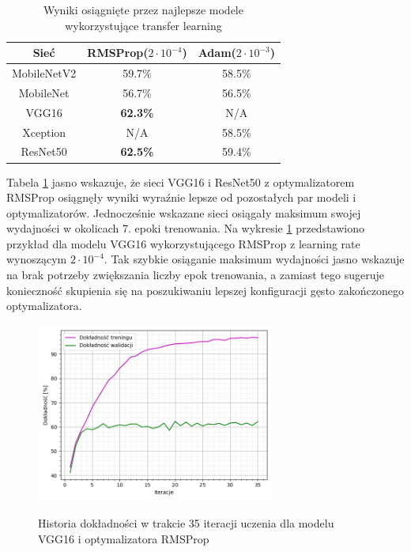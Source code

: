 \begin{table}[H]
  \centering
  \caption{Wyniki osiągnięte przez najlepsze modele wykorzystujące transfer learning}
    \begin{tabular}{ |c|c|c| }
    \hline
    Sieć & RMSProp($2\cdot10^{-4}$) & Adam($2\cdot10^{-3}$) \\
    \hline
    MobileNetV2 & 59.7\% & 58.5\% \\ 
    MobileNet & 56.7\% & 56.5\% \\ 
    VGG16 & \textbf{62.3\%} & N/A \\
    Xception & N/A & 58.5\% \\ 
    ResNet50 & \textbf{62.5\%} & 59.4\% \\ 
    \hline
    \end{tabular}
  \label{tab:5.13}
\end{table}

Tabela \ref{tab:5.13} jasno wskazuje, że sieci VGG16 i ResNet50 z optymalizatorem RMSProp osiągnęły wyniki wyraźnie lepsze od pozostałych par modeli i optymalizatorów. Jednocześnie wskazane sieci osiągały maksimum swojej wydajności w okolicach 7. epoki trenowania. Na wykresie \ref{pic:5.6} przedstawiono przykład dla modelu VGG16 wykorzystującego RMSProp z learning rate wynoszącym $2\cdot10^{-4}$. Tak szybkie osiąganie maksimum wydajności jasno wskazuje na brak potrzeby zwiększania liczby epok trenowania, a zamiast tego sugeruje konieczność skupienia się na poszukiwaniu lepszej konfiguracji gęsto zakończonego optymalizatora.

\begin{figure}[H]
    \caption{Historia dokładności w trakcie 35 iteracji uczenia dla modelu VGG16 i optymalizatora RMSProp}
    \centering
    \includegraphics[width=0.7\textwidth]{wykres6.png}
    \label{pic:5.6}
\end{figure}

